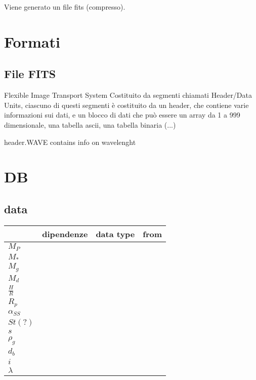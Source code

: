 \documentclass[DIN, pagenumber=false, fontsize=11pt, parskip=half]{scrartcl}
\begin{document}
Viene generato un file fits (compresso).

\section{Formati}

\subsection{File FITS}
Flexible Image Transport System
Costituito da segmenti chiamati Header/Data Units, ciascuno di questi segmenti è costituito da un header, che contiene varie informazioni sui dati, e un blocco di dati che può essere un array da 1 a 999 dimensionale, una tabella ascii, una tabella binaria (...)

header.WAVE contains info on wavelenght
\section{DB}
\subsection{data}
\begin{center}
\begin{tabular}{l | c c c }
\toprule
       & dipendenze & data type & from \\
\midrule       
 $M_P$ & \\
 $M_*$ & \\
 $M_g$ & \\
 $M_d$ & \\
 $\frac  HR$ & \\
 $R_p$ & \\
 $\alpha_{SS}$ & \\
 $St (?)$ & \\
 $s$ & \\
 $\rho_g$ & \\
 $d_b$ & \\
 $i$ & \\
 $\lambda$ & \\
 \bottomrule
\end{tabular}
\end{center}
\end{document}
